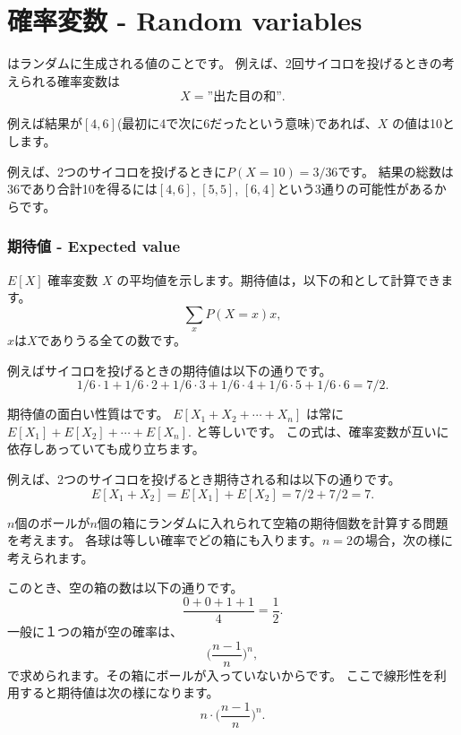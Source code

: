 \section{確率変数 - Random variables}


 はランダムに生成される値のことです。
例えば、2回サイコロを投げるときの考えられる確率変数は
\[X=\textrm{''出た目の和''}.\]

例えば結果が$[4, 6]$(最初に4で次に6だったという意味)であれば、$X$ の値は10とします。

例えば、2つのサイコロを投げるときに$P(X=10)=3/36$です。
結果の総数は36であり合計10を得るには$[4,6]$, $[5,5]$, $[6,4]$という3通りの可能性があるからです。

\subsubsection{期待値 - Expected value}


 $E[X]$ 確率変数 $X$ の平均値を示します。期待値は，以下の和として計算できます。
\[\sum_x P(X=x)x,\]
$x$は$X$でありうる全ての数です。

例えばサイコロを投げるときの期待値は以下の通りです。
\[1/6 \cdot 1 + 1/6 \cdot 2 + 1/6 \cdot 3 + 1/6 \cdot 4 + 1/6 \cdot 5 + 1/6 \cdot 6 = 7/2.\]

期待値の面白い性質はです。
$E[X_1+X_2+\cdots+X_n]$
は常に
$E[X_1]+E[X_2]+\cdots+E[X_n]$.
と等しいです。
この式は、確率変数が互いに依存しあっていても成り立ちます。

例えば、2つのサイコロを投げるとき期待される和は以下の通りです。
\[E[X_1+X_2]=E[X_1]+E[X_2]=7/2+7/2=7.\]

$n$個のボールが$n$個の箱にランダムに入れられて空箱の期待個数を計算する問題を考えます。
各球は等しい確率でどの箱にも入ります。$n = 2$の場合，次の様に考えられます。
\begin{center}
\end{center}
このとき、空の箱の数は以下の通りです。
\[\frac{0+0+1+1}{4} = \frac{1}{2}.\]
一般に１つの箱が空の確率は、
\[\Big(\frac{n-1}{n}\Big)^n,\]
で求められます。その箱にボールが入っていないからです。
ここで線形性を利用すると期待値は次の様になります。
\[n \cdot \Big(\frac{n-1}{n}\Big)^n.\]


